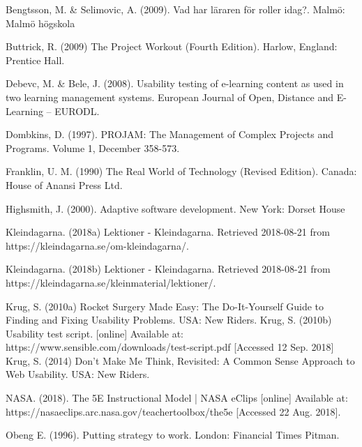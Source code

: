 \makeatletter
\renewcommand\@biblabel[1]{}
\makeatother

\begin{thebibliography}{69}

     Bengtsson, M. \& Selimovic, A. (2009). Vad har läraren för roller idag?. Malmö: Malmö högskola

     Buttrick, R. (2009) The Project Workout (Fourth Edition). Harlow, England: Prentice Hall.
 
	 Debevc, M. \& Bele, J. (2008). Usability testing of e-learning content as used in two learning management systems. European Journal of Open, Distance and E-Learning – EURODL. 
 
     Dombkins, D. (1997). PROJAM: The Management of Complex Projects and Programs. Volume 1, December 358-573.
  
     Franklin, U. M. (1990) The Real World of Technology (Revised Edition). Canada: House of Anansi Press Ltd.
  
     Highsmith, J. (2000). Adaptive software development. New York: Dorset House
  
     Kleindagarna. (2018a) Lektioner - Kleindagarna. Retrieved 2018-08-21 from https://kleindagarna.se/om-kleindagarna/.
  
     Kleindagarna. (2018b) Lektioner - Kleindagarna. Retrieved 2018-08-21 from https://kleindagarna.se/kleinmaterial/lektioner/.
  
     Krug, S. (2010a) Rocket Surgery Made Easy: The Do-It-Yourself Guide to Finding and Fixing Usability Problems. USA: New Riders.
	 Krug, S. (2010b) Usability test script. [online] Available at: https://www.sensible.com/downloads/test-script.pdf [Accessed 12 Sep. 2018]
     Krug, S. (2014) Don't Make Me Think, Revisited: A Common Sense Approach to Web Usability. USA: New Riders.
    
     NASA. (2018). The 5E Instructional Model | NASA eClips [online] Available at: https://nasaeclips.arc.nasa.gov/teachertoolbox/the5e [Accessed 22 Aug. 2018].

     Obeng E. (1996). Putting strategy to work. London: Financial Times Pitman.

    \newpage


\end{thebibliography}
